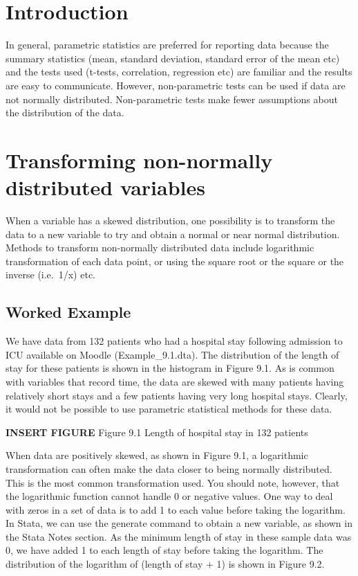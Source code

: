 \documentclass[
]{memoir}
\begin{document}
\hypertarget{introduction-7}{%
\section{Introduction}\label{introduction-7}}

In general, parametric statistics are preferred for reporting data because the summary statistics (mean, standard deviation, standard error of the mean etc) and the tests used (t-tests, correlation, regression etc) are familiar and the results are easy to communicate. However, non-parametric tests can be used if data are not normally distributed. Non-parametric tests make fewer assumptions about the distribution of the data.

\hypertarget{transforming-non-normally-distributed-variables}{%
\section{Transforming non-normally distributed variables}\label{transforming-non-normally-distributed-variables}}

When a variable has a skewed distribution, one possibility is to transform the data to a new variable to try and obtain a normal or near normal distribution. Methods to transform non-normally distributed data include logarithmic transformation of each data point, or using the square root or the square or the inverse (i.e.~1/x) etc.

\hypertarget{worked-example-12}{%
\subsection{Worked Example}\label{worked-example-12}}

We have data from 132 patients who had a hospital stay following admission to ICU available on Moodle (Example\_9.1.dta). The distribution of the length of stay for these patients is shown in the histogram in Figure 9.1. As is common with variables that record time, the data are skewed with many patients having relatively short stays and a few patients having very long hospital stays. Clearly, it would not be possible to use parametric statistical methods for these data.

\textbf{INSERT FIGURE}
Figure 9.1 Length of hospital stay in 132 patients

When data are positively skewed, as shown in Figure 9.1, a logarithmic transformation can often make the data closer to being normally distributed. This is the most common transformation used. You should note, however, that the logarithmic function cannot handle 0 or negative values. One way to deal with zeros in a set of data is to add 1 to each value before taking the logarithm.
In Stata, we can use the generate command to obtain a new variable, as shown in the Stata Notes section. As the minimum length of stay in these sample data was 0, we have added 1 to each length of stay before taking the logarithm. The distribution of the logarithm of (length of stay + 1) is shown in Figure 9.2.
\end{document}
